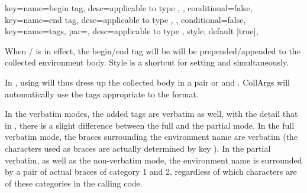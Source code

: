 \documentclass[a4paper,11pt]{article}
\begin{document}
\begin{doc}[
    pi={\docaux{cmd}{ifcollargsBeginTag}, \docaux{cmd}{ifcollargsEndTag};
        \refcollargs{tags} has no corresponding low-level command}
    ]{
      key={name=begin tag, desc={applicable to type ,{ }}, conditional=false},
      key={name=end tag, desc={applicable to type ,{ }}, conditional=false},
      key={name=tags, par=, %
        desc={applicable to type , style, default |true|}},
    }

  When \slash {} is in effect, the
  begin\slash end tag will be will be prepended/appended to the collected
  environment body. Style  is a shortcut for setting
   and  simultaneously.

  In , using  will thus dress up the
  collected body in a pair or  and
  .  CollArgs will automatically use the tags
  appropriate to the format.

  In the verbatim modes, the added tags are verbatim as well, with the detail
  that in , there is a slight difference between the full
   and the partial  mode.  In the
  full verbatim mode, the braces surrounding the environment name are verbatim
  (the characters used as braces are actually determined by key
  ).  In the partial verbatim, as well as the
  non-verbatim mode, the environment name is surrounded by a pair of actual
  braces of category 1 and 2, regardless of which characters are of these
  categories in the calling code.
\end{doc}
\end{document}

